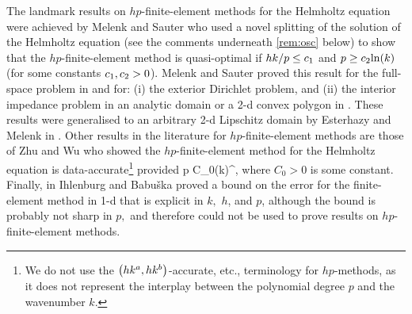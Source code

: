 The landmark results on $hp$-finite-element methods for the Helmholtz equation were achieved by Melenk and Sauter \cite{MeSa:10,MeSa:11} who used a novel splitting of the solution of the Helmholtz equation (see the comments underneath \cref{rem:osc} below) to show that the $hp$-finite-element method is quasi-optimal if $hk/p \leq c_{1}$ and $p \geq \ct \ln k$ (for some constants $c_{1},c_{2}>0$). Melenk and Sauter proved this result for the full-space problem in \cite{MeSa:10} and for: (i) the exterior Dirichlet problem, and (ii) the interior impedance problem in an analytic domain or a 2-d convex polygon in \cite{MeSa:11}. These results were generalised to an arbitrary 2-d Lipschitz domain by Esterhazy and Melenk in \cite[Theorem 4.2]{EsMe:12}. Other results in the literature for $hp$-finite-element methods are those of Zhu and Wu \cite[Equation (1.7)]{ZhWu:13} who showed the $hp$-finite-element method for the Helmholtz equation is data-accurate\footnote{We do not use the $\hk{a}b$-accurate, etc., terminology for $hp$-methods, as it does not represent the interplay between the polynomial degree $p$ and the wavenumber $k$.} provided
\beqs
{}p \leq C_0\mleft(k\mright)^{},
\eeqs
where $C_0>0$ is some constant. Finally, in \cite[Corollary 3.2]{IhBa:97} Ihlenburg and Babu\v{s}ka proved a bound on the error for the finite-element method in 1-d that is explicit in $k,$ $h$, and $p$, although the bound is probably not sharp in $p,$ and therefore could not be used to prove results on $hp$-finite-element methods.

